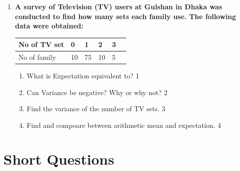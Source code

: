 \documentclass[a4paper,oneside]{book}
\begin{document}
\begin{enumerate}
  \begin{enumerate}
    \item
	Can the expectation of a random variable be negative? \hfill 1
    \item
    	Find the expected sales of the store on a given day. \hfill 2
    \item
    	Compute the dispersion of sales f the store. \hfill 3
     \item
     	To make the expected sale 280, what sale does the store need in place of 200? \hfill 4
  \end{enumerate}
  
     \item
	  \textbf{A survey of Television (TV) users at Gulshan in Dhaka was conducted to find how many sets each family use. The following data were obtained:} 
	  
	  	  \begin{table}[h]
	  \begin{center}
\begin{tabular}{llllll}
No of TV set    & 0 & 1  & 2 & 3    \\ \hline
No of family & 10 & 75 & 10 & 5
\end{tabular}
\end{center}	
\end{table}
  
  \begin{enumerate}
    \item
	What is Expectation equivalent to? \hfill 1
    \item
	Can Variance be negative? Why or why not? \hfill 2
    \item  
	Find the variance of the number of TV sets. \hfill 3
    \item
	Find and compoare between arithmetic mean and expectation. \hfill 4
  \end{enumerate}
  \end{enumerate}
  
\section{Short Questions}
\end{document}

